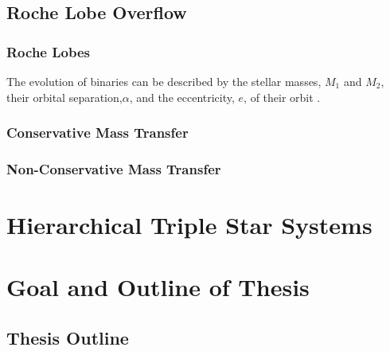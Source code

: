 
\subsection{Roche Lobe Overflow}

\subsubsection{Roche Lobes}

The evolution of binaries can be described by the stellar masses, $M_1$ and $M_2$, their orbital separation,$\alpha$, and the eccentricity, $e$, of their orbit \citep{postnov2014evolution,sana2012binary,toonen2014popcorn}.

\subsubsection{Conservative Mass Transfer}

\subsubsection{Non-Conservative Mass Transfer}


\section{Hierarchical Triple Star Systems}


\section{Goal and Outline of Thesis}


\subsection{Thesis Outline}
